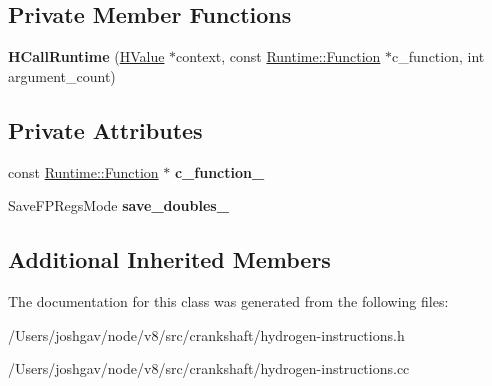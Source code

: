 \subsection*{Private Member Functions}
\begin{DoxyCompactItemize}
\item 
{\bfseries H\+Call\+Runtime} (\hyperlink{classv8_1_1internal_1_1_h_value}{H\+Value} $\ast$context, const \hyperlink{structv8_1_1internal_1_1_runtime_1_1_function}{Runtime\+::\+Function} $\ast$c\+\_\+function, int argument\+\_\+count)\hypertarget{classv8_1_1internal_1_1_h_call_runtime_a611c4ac4328aa9f4107e06e2ce77de16}{}\label{classv8_1_1internal_1_1_h_call_runtime_a611c4ac4328aa9f4107e06e2ce77de16}

\end{DoxyCompactItemize}
\subsection*{Private Attributes}
\begin{DoxyCompactItemize}
\item 
const \hyperlink{structv8_1_1internal_1_1_runtime_1_1_function}{Runtime\+::\+Function} $\ast$ {\bfseries c\+\_\+function\+\_\+}\hypertarget{classv8_1_1internal_1_1_h_call_runtime_ad719804d11321b1d6f76ba730c63a867}{}\label{classv8_1_1internal_1_1_h_call_runtime_ad719804d11321b1d6f76ba730c63a867}

\item 
Save\+F\+P\+Regs\+Mode {\bfseries save\+\_\+doubles\+\_\+}\hypertarget{classv8_1_1internal_1_1_h_call_runtime_a52e994baf8f46ff33b8282a17edba359}{}\label{classv8_1_1internal_1_1_h_call_runtime_a52e994baf8f46ff33b8282a17edba359}

\end{DoxyCompactItemize}
\subsection*{Additional Inherited Members}


The documentation for this class was generated from the following files\+:\begin{DoxyCompactItemize}
\item 
/\+Users/joshgav/node/v8/src/crankshaft/hydrogen-\/instructions.\+h\item 
/\+Users/joshgav/node/v8/src/crankshaft/hydrogen-\/instructions.\+cc\end{DoxyCompactItemize}
